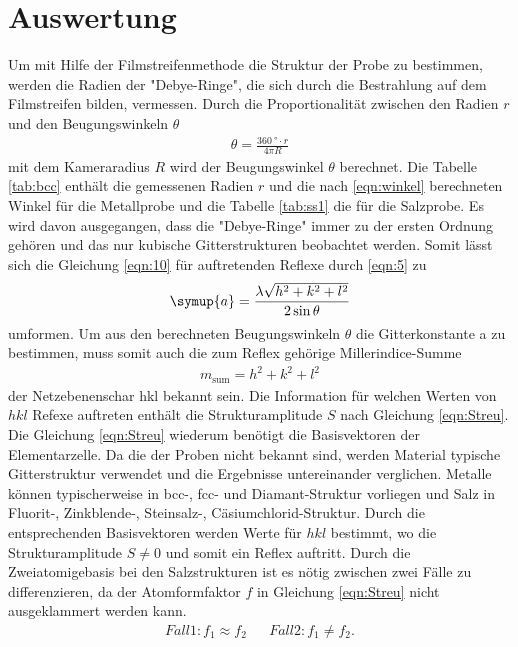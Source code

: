 \section{Auswertung}
\label{sec:Auswertung}

Um mit Hilfe der Filmstreifenmethode die Struktur der Probe zu bestimmen, werden
die Radien der "Debye-Ringe", die sich durch die Bestrahlung auf dem Filmstreifen bilden,
vermessen. Durch die Proportionalität zwischen den Radien $r$ und den Beugungswinkeln $\theta$
\begin{align}
\theta=\frac{\SI{360}{\degree}\cdot r}{4 \pi R } \label{eqn:winkel}
\end{align}
mit dem Kameraradius $R$ wird der Beugungswinkel $\theta$ berechnet.
Die Tabelle \ref{tab:bcc} enthält die gemessenen Radien $r$
und die nach \ref{eqn:winkel} berechneten Winkel
für die Metallprobe und die Tabelle \ref{tab:ss1} die für die Salzprobe.
Es wird davon ausgegangen, dass die "Debye-Ringe" immer zu der ersten Ordnung gehören
und das nur kubische Gitterstrukturen beobachtet werden.
Somit lässt sich die Gleichung \ref{eqn:10} für auftretenden
Reflexe durch \eqref{eqn:5} zu
\begin{align}
\symup{a} = \frac{\lambda \sqrt{h^2 +k^2+l^2}}{2\sin{\theta}} \label{eqn:Gitterkonst}
\end{align}
umformen.
Um aus den berechneten Beugungswinkeln $\theta$ die Gitterkonstante a
zu bestimmen, muss somit auch die zum Reflex gehörige Millerindice-Summe
\begin{align*}
  m_{\mathrm{sum}}=h^{2} + k^{2} + l^{2}
\end{align*}
der Netzebenenschar hkl bekannt sein.
Die Information für welchen Werten von $hkl$ Refexe auftreten
enthält die Strukturamplitude $S$ nach Gleichung \eqref{eqn:Streu}.
Die Gleichung \eqref{eqn:Streu} wiederum benötigt die Basisvektoren
der Elementarzelle. Da die der Proben nicht bekannt sind, werden
Material typische Gitterstruktur verwendet und die Ergebnisse
untereinander verglichen. Metalle können typischerweise in
 bcc-, fcc- und Diamant-Struktur
vorliegen und Salz in Fluorit-, Zinkblende-,
Steinsalz-, Cäsiumchlorid-Struktur.
Durch die entsprechenden Basisvektoren
werden Werte für $hkl$ bestimmt, wo die Strukturamplitude
$S\neq0$ und somit ein Reflex auftritt.
Durch die Zweiatomigebasis bei den
Salzstrukturen ist es nötig zwischen zwei Fälle zu differenzieren,
da der Atomformfaktor $f$ in Gleichung
\eqref{eqn:Streu} nicht ausgeklammert werden kann.
\begin{align*}
  Fall 1: f_1\approx f_2  & & Fall 2: f_1\neq f_2.
\end{align*}
